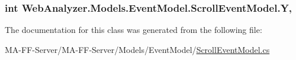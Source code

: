\subsubsection[{Y}]{\setlength{\rightskip}{0pt plus 5cm}int Web\+Analyzer.\+Models.\+Event\+Model.\+Scroll\+Event\+Model.\+Y\hspace{0.3cm}{\ttfamily [get]}, {\ttfamily [set]}}\label{class_web_analyzer_1_1_models_1_1_event_model_1_1_scroll_event_model_a2247392c27cb5d65d023966dcf9a899d}


The documentation for this class was generated from the following file\+:\begin{DoxyCompactItemize}
\item 
M\+A-\/\+F\+F-\/\+Server/\+M\+A-\/\+F\+F-\/\+Server/\+Models/\+Event\+Model/\hyperlink{_scroll_event_model_8cs}{Scroll\+Event\+Model.\+cs}\end{DoxyCompactItemize}
